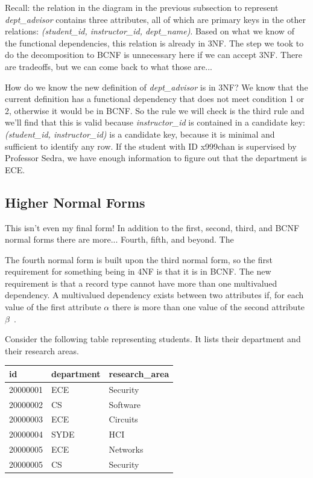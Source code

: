 Recall: the relation in the diagram in the previous subsection to represent \textit{dept\_advisor} contains three attributes, all of which are primary keys in the other relations: \textit{(student\_id, instructor\_id, dept\_name)}. Based on what we know of the functional dependencies, this relation is already in 3NF. The step we took to do the decomposition to BCNF is unnecessary here if we can accept 3NF. There are tradeoffs, but we can come back to what those are...

How do we know the new definition of \textit{dept\_advisor} is in 3NF? We know that the current definition has a functional dependency that does not meet condition 1 or 2, otherwise it would be in BCNF. So the rule we will check is the third rule and we'll find that this is valid because \textit{instructor\_id} is contained in a candidate key: \textit{(student\_id, instructor\_id)} is a candidate key, because it is minimal and sufficient to identify any row. If the student with ID x999chan is supervised by Professor Sedra, we have enough information to figure out that the department is ECE.

\subsection*{Higher Normal Forms}
This isn't even my final form! In addition to the first, second, third, and BCNF normal forms there are more... Fourth, fifth, and beyond. The 

The fourth normal form is built upon the third normal form, so the first requirement for something being in 4NF is that it is in BCNF. The new requirement is that a record type cannot have more than one multivalued dependency. A multivalued dependency exists between two attributes if, for each value of the first attribute $\alpha$ there is more than one value of the second attribute $\beta$~\cite{fournorm}. 

Consider the following table representing students. It lists their department and their research areas. 

\begin{center}
\begin{tabular}{|l|l|l|} \hline
	\textbf{id} & \textbf{department} & \textbf{research\_area} \\ \hline
	20000001 & ECE & Security \\ \hline
	20000002 & CS & Software \\ \hline
    20000003 & ECE & Circuits \\ \hline
    20000004 & SYDE & HCI \\ \hline
    20000005 & ECE & Networks \\ \hline
    20000005 & CS & Security \\ \hline
\end{tabular}
\end{center}

